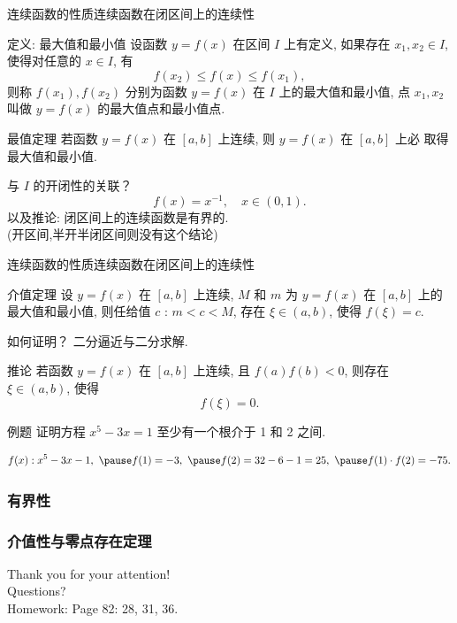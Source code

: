 \documentclass[
10pt,
aspectratio=43,
]{beamer}
\begin{document}
\begin{frame}{连续函数的性质}{连续函数在闭区间上的连续性}
	\begin{block}{定义: 最大值和最小值}
		设函数 $y=f(x)$ 在区间 $I$ 上有定义, 如果存在 $x_1, x_2 \in I$, 使得对任意的 $x \in I$, 有
		$$
		f\left(x_2\right) \leq f(x) \leq f\left(x_1\right),
		$$
		则称 $f\left(x_1\right), f\left(x_2\right)$ 分别为函数 $y=f(x)$ 在 $I$ 上的最大值和最小值, 点 $x_1, x_2$ 叫做 $y=f(x)$ 的最大值点和最小值点.
	\end{block}
	\begin{block}{最值定理}
		若函数 $y=f(x)$ 在 $[a, b]$ 上连续, 则 $y=f(x)$ 在 $[a, b]$ 上必 取得最大值和最小值.
	\end{block}
	\pause 与 $I$ 的开闭性的关联？\pause 
	\begin{equation*}
		f(x) = x^{-1},\quad x\in(0,1).
	\end{equation*}
	\pause 以及推论: 闭区间上的连续函数是有界的.\\
	\pause (开区间,半开半闭区间则没有这个结论)
\end{frame}

\begin{frame}{连续函数的性质}{连续函数在闭区间上的连续性}
	\begin{block}{介值定理}
		设 $y=f(x)$ 在 $[a, b]$ 上连续, $M$ 和 $m$ 为 $y=f(x)$ 在 $[a, b]$ 上的最大值和最小值, 则任给值 $c$ : $m<c<M$, 存在 $\xi \in(a, b)$, 使得 $f(\xi)=c$.
	\end{block}
	\pause 如何证明？ \pause 二分逼近与二分求解.
	\begin{block}{推论}
		若函数 $y=f(x)$ 在 $[a, b]$ 上连续, 且 $f(a) f(b)<0$, 则存在 $\xi \in(a, b)$, 使得
		$$
		f(\xi)=0 .
		$$
	\end{block}

	\begin{exampleblock}{例题}
		证明方程 $x^5-3 x=1$ 至少有一个根介于 1 和 2 之间.
	\end{exampleblock}
	\begin{equation*}
		f(x):x^5-3 x-1, \,\, \pause f(1)=-3, \,\, \pause f(2)=32-6-1=25,\,\, \pause f(1)\cdot f(2) =-75.
	\end{equation*}
\end{frame}

\subsubsection{有界性}
\subsubsection{介值性与零点存在定理}




\begin{frame}[plain]
	\vfill
	\centering
	{
		\centering \Huge \color{white} Thank you for your attention!\\[10pt]Questions?\bigskip \\
		Homework: Page 82: 28, 31, 36.
	}
	\vfill
\end{frame}
\end{document}
